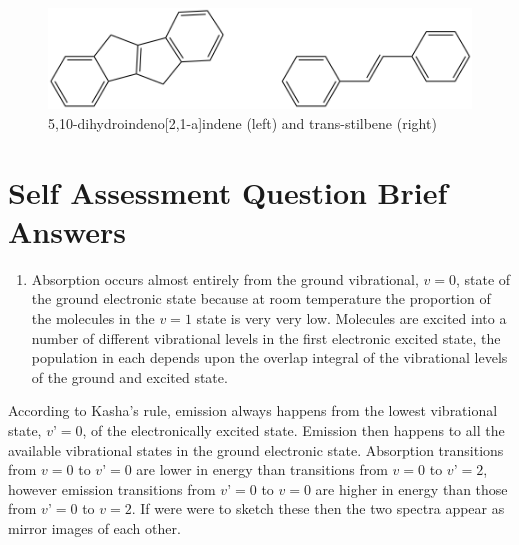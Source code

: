 \documentclass[
]{book}
\providecommand{\tightlist}{%
  \setlength{\itemsep}{0pt}\setlength{\parskip}{0pt}}
\begin{document}
\begin{figure}

{\centering \includegraphics[width=0.6\linewidth]{images/stilbeneindene} 

}

\caption{5,10-dihydroindeno[2,1-a]indene (left) and trans-stilbene (right)}\label{fig:stilbeneindene}
\end{figure}

\hypertarget{sec:SSQemissionans}{%
\section{Self Assessment Question Brief Answers}\label{sec:SSQemissionans}}

\begin{enumerate}
\def\labelenumi{\arabic{enumi}.}
\tightlist
\item
  Absorption occurs almost entirely from the ground vibrational, \(v = 0\), state of the ground electronic state because at room temperature the proportion of the molecules in the \(v = 1\) state is very very low. Molecules are excited into a number of different vibrational levels in the first electronic excited state, the population in each depends upon the overlap integral of the vibrational levels of the ground and excited state.
\end{enumerate}

According to Kasha's rule, emission always happens from the lowest vibrational state, \(v’ = 0\), of the electronically excited state. Emission then happens to all the available vibrational states in the ground electronic state. Absorption transitions from \(v = 0\) to \(v’ = 0\) are lower in energy than transitions from \(v = 0\) to \(v’ = 2\), however emission transitions from \(v’ = 0\) to \(v = 0\) are higher in energy than those from \(v’ = 0\) to \(v = 2\). If were were to sketch these then the two spectra appear as mirror images of each other.
\end{document}
